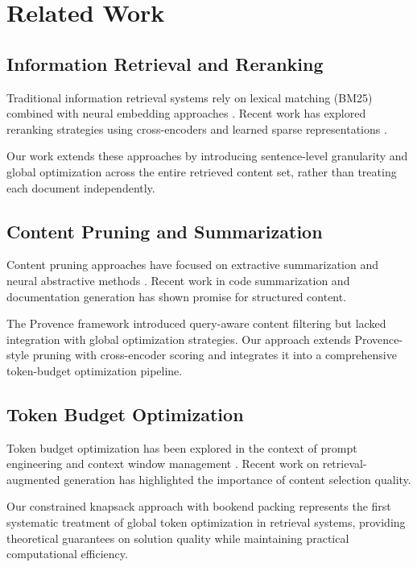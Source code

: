 \documentclass[conference]{IEEEtran}
\begin{document}
\section{Related Work}

\subsection{Information Retrieval and Reranking}

Traditional information retrieval systems rely on lexical matching (BM25) \cite{robertson2009probabilistic} combined with neural embedding approaches \cite{karpukhin2020dense}. Recent work has explored reranking strategies using cross-encoders \cite{nogueira2019passage} and learned sparse representations \cite{formal2021splade}.

Our work extends these approaches by introducing sentence-level granularity and global optimization across the entire retrieved content set, rather than treating each document independently.

\subsection{Content Pruning and Summarization}

Content pruning approaches have focused on extractive summarization \cite{nallapati2017summarunner} and neural abstractive methods \cite{see2017get}. Recent work in code summarization \cite{alon2018code2seq} and documentation generation \cite{hu2018deep} has shown promise for structured content.

The Provence framework \cite{provence2023} introduced query-aware content filtering but lacked integration with global optimization strategies. Our approach extends Provence-style pruning with cross-encoder scoring and integrates it into a comprehensive token-budget optimization pipeline.

\subsection{Token Budget Optimization}

Token budget optimization has been explored in the context of prompt engineering \cite{brown2020language} and context window management \cite{beltagy2020longformer}. Recent work on retrieval-augmented generation \cite{lewis2020retrieval} has highlighted the importance of content selection quality.

Our constrained knapsack approach with bookend packing represents the first systematic treatment of global token optimization in retrieval systems, providing theoretical guarantees on solution quality while maintaining practical computational efficiency.
\end{document}
